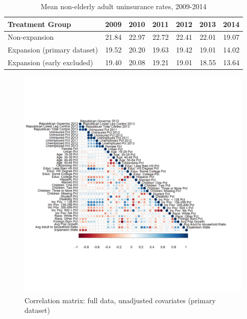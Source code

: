 \begin{table}[ht]
\centering
\caption{Mean non-elderly adult uninsurance rates, 2009-2014}\label{tab:timetrends}
\begin{tabular}{lrrrrrr}
  \hline
Treatment Group & 2009 & 2010 & 2011 & 2012 & 2013 & 2014 \\ 
  \hline
Non-expansion & 21.84 & 22.97 & 22.72 & 22.41 & 22.01 & 19.07 \\ 
  Expansion (primary dataset) & 19.52 & 20.20 & 19.63 & 19.42 & 19.01 & 14.02 \\ 
  Expansion (early excluded) & 19.40 & 20.08 & 19.21 & 19.01 & 18.55 & 13.64 \\ 
   \hline
\end{tabular}
\end{table}

\begin{figure}[h!]
\begin{center}
    \caption{Correlation matrix: full data, unadjusted covariates \newline (primary dataset)}
    \label{fig:corrmatrix}
    \includegraphics[scale=0.25]{01_Plots/correlation-plot-c1-sigma-zero.png}
\end{center}
\end{figure}

\clearpage